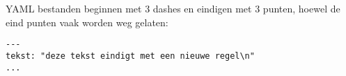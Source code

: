 YAML bestanden beginnen met 3 dashes en eindigen met 3 punten, hoewel de eind punten vaak worden weg gelaten:
\begin{verbatim}
---
tekst: "deze tekst eindigt met een nieuwe regel\n"
...
\end{verbatim}


